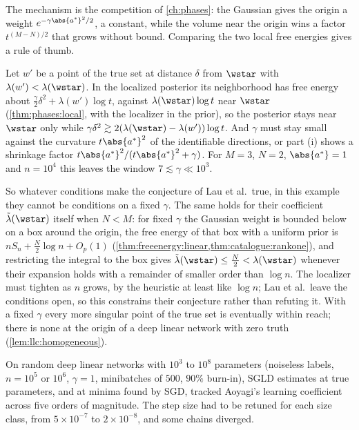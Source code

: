\begin{refsection}
The mechanism is the competition of \cref{ch:phases}: the Gaussian gives the origin a weight $e^{-\gamma\abs{a^*}^2/2}$, a constant, while the volume near the origin wins a factor $t^{(M-N)/2}$ that grows without bound. Comparing the two local free energies gives a rule of thumb.

\begin{heuristic}
Let $w'$ be a point of the true set at distance $\delta$ from $\wstar$ with $\lambda(w')<\lambda(\wstar)$. In the localized posterior its neighborhood has free energy about $\frac\gamma2\delta^2+\lambda(w')\log t$, against $\lambda(\wstar)\log t$ near $\wstar$ (\cref{thm:phases:local}, with the localizer in the prior), so the posterior stays near $\wstar$ only while $\gamma\delta^2\gtrsim2(\lambda(\wstar)-\lambda(w'))\log t$. And $\gamma$ must stay small against the curvature $t\abs{a^*}^2$ of the identifiable directions, or part (i) shows a shrinkage factor $t\abs{a^*}^2/(t\abs{a^*}^2+\gamma)$. For $M=3$, $N=2$, $\abs{a^*}=1$ and $n=10^4$ this leaves the window $7\lesssim\gamma\ll10^3$.
\end{heuristic}

So whatever conditions make the conjecture of Lau et al.\ true, in this example they cannot be conditions on a fixed $\gamma$. The same holds for their coefficient $\tilde\lambda(\wstar)$ itself when $N<M$: for fixed $\gamma$ the Gaussian weight is bounded below on a box around the origin, the free energy of that box with a uniform prior is $nS_n+\tfrac N2\log n+O_p(1)$ (\cref{thm:freeenergy:linear,thm:catalogue:rankone}), and restricting the integral to the box gives $\tilde\lambda(\wstar)\le\tfrac N2<\lambda(\wstar)$ whenever their expansion holds with a remainder of smaller order than $\log n$. The localizer must tighten as $n$ grows, by the heuristic at least like $\log n$; Lau et al.\ leave the conditions open, so this constrains their conjecture rather than refuting it. With a fixed $\gamma$ every more singular point of the true set is eventually within reach; there is none at the origin of a deep linear network with zero truth (\cref{lem:llc:homogeneous}).

\begin{observation}
On random deep linear networks with $10^3$ to $10^8$ parameters (noiseless labels, $n=10^5$ or $10^6$, $\gamma=1$, minibatches of $500$, $90\%$ burn-in), SGLD estimates at true parameters, and at minima found by SGD, tracked Aoyagi's learning coefficient across five orders of magnitude. The step size had to be retuned for each size class, from $5\times10^{-7}$ to $2\times10^{-8}$, and some chains diverged.
\end{observation}


\end{refsection}
